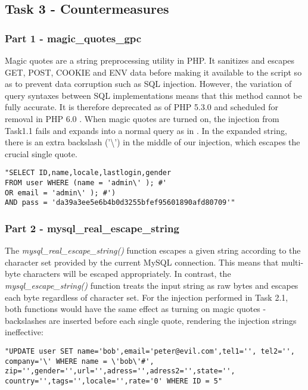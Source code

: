 \subsection{Task 3 - Countermeasures}
\subsubsection{Part 1 - magic\_quotes\_gpc}
Magic quotes are a string preprocessing utility in PHP. It sanitizes and escapes GET, POST, COOKIE and ENV data before making it available to the script so as to prevent data corruption such as SQL injection. However, the variation of query syntaxes between SQL implementations means that this method cannot be fully accurate. It is therefore deprecated as of PHP 5.3.0 and scheduled for removal in PHP 6.0 \cite{Group2009}. When magic quotes are turned on, the injection from Task1.1 fails and expands into a normal query as in . In the expanded string, there is an extra backslash ('\textbackslash') in the middle of our injection, which escapes the crucial single quote.

\begin{minipage}{\linewidth}
\begin{lstlisting}[caption={Escaped Task 1.1 injection expansion},
label={lst:l4_t3p1_mq},
frame=single]
"SELECT ID,name,locale,lastlogin,gender
FROM user WHERE (name = 'admin\' ); #'
OR email = 'admin\' ); #')
AND pass = 'da39a3ee5e6b4b0d3255bfef95601890afd80709'"
\end{lstlisting}
\end{minipage}

\subsubsection{Part 2 - mysql\_real\_escape\_string}
The \emph{mysql\_real\_escape\_string()} function escapes a given string according to the character set provided by the current MySQL connection. This means that multi-byte characters will be escaped appropriately. In contrast, the \emph{mysql\_escape\_string()} function treats the input string as raw bytes and escapes each byte regardless of character set. For the injection performed in Task 2.1, both functions would have the same effect as turning on magic quotes - backslashes are inserted before each single quote, rendering the injection strings ineffective:

\begin{minipage}{\linewidth}
\begin{lstlisting}[caption={Escaped Task2.1 injection expansion},
label={lst:l4_t3p2_compatkres},
frame=single]
"UPDATE user SET name='bob',email='peter@evil.com',tel1='', tel2='',
company='\' WHERE name = \'bob\'#',
zip='',gender='',url='',adress='',adress2='',state='',
country='',tags='',locale='',rate='0' WHERE ID = 5"
\end{lstlisting}
\end{minipage}

